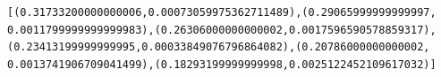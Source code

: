 \documentclass[letterpaper,10pt,english]{/usr/share/sphinx/texinputs/sphinxhowto}
\newenvironment{InvisibleVerbatim}
        {\begin{mdframed}[leftmargin=0.1\linewidth,innerleftmargin=3pt,innerrightmargin=3pt, userdefinedwidth=1\linewidth, linewidth=0pt, linecolor=white, usetwoside=false]}
        {\end{mdframed}}
\begin{document}
    

        
        

            
                \begin{InvisibleVerbatim}
                \vspace{-0.5\baselineskip}
\begin{alltt}[(0.31733200000000006, 0.00073059975362711489), (0.29065999999999997,
0.0011799999999999983), (0.26306000000000002, 0.0017596590578859317),
(0.23413199999999995, 0.00033849076796864082), (0.20786000000000002,
0.0013741906709041499), (0.18293199999999998, 0.0025122452109617032)]
\end{alltt}

            \end{InvisibleVerbatim}
            
        
    


\end{document}
